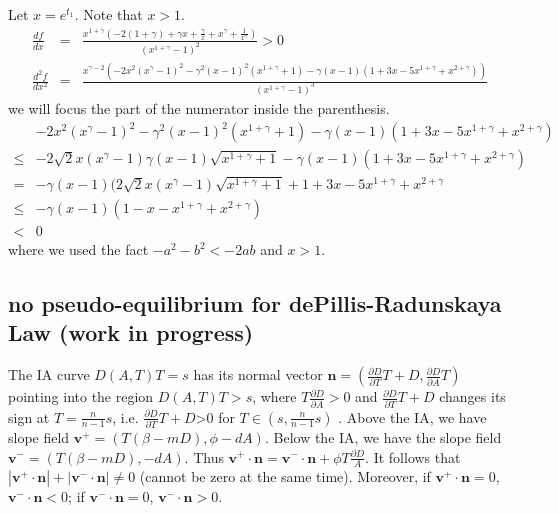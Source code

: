 \documentclass[review,authoryear]{elsarticle}
\begin{document}
Let $x=e^{t_{1}}$. Note that $x>1$. 
\begin{eqnarray*}
\frac{df}{dx} & = & \frac{x^{1+\gamma}(-2(1+\gamma)+\gamma x+\frac{\gamma}{x}+x^{\gamma}+\frac{1}{x^{\gamma}})}{(x^{1+\gamma}-1)^{2}}>0\\
\frac{d^{2}f}{dx^{2}} & = & \frac{x^{\gamma-2}(-2x^{2}(x^{\gamma}-1)^{2}-\gamma^{2}(x-1)^{2}(x^{1+\gamma}+1)-\gamma(x-1)(1+3x-5x^{1+\gamma}+x^{2+\gamma}))}{(x^{1+\gamma}-1)^{3}}
\end{eqnarray*}
we will focus the part of the numerator inside the parenthesis. 
\begin{align*}
 & -2x^{2}(x^{\gamma}-1)^{2}-\gamma^{2}(x-1)^{2}(x^{1+\gamma}+1)-\gamma(x-1)(1+3x-5x^{1+\gamma}+x^{2+\gamma})\\
\le & -2\sqrt{2}x(x^{\gamma}-1)\gamma(x-1)\sqrt{x^{1+\gamma}+1}-\gamma(x-1)(1+3x-5x^{1+\gamma}+x^{2+\gamma})\\
= & -\gamma(x-1)(2\sqrt{2}x(x^{\gamma}-1)\sqrt{x^{1+\gamma}+1}+1+3x-5x^{1+\gamma}+x^{2+\gamma}\\
\le & -\gamma(x-1)(1-x-x^{1+\gamma}+x^{2+\gamma})\\
< & 0
\end{align*}
where we used the fact $-a^{2}-b^{2}<-2ab$ and $x>1$. 

\subsection*{no pseudo-equilibrium for dePillis-Radunskaya Law (work in progress)}

The IA curve $D(A,T)T=s$ has its normal vector $\mathbf{n}=(\frac{\partial D}{\partial T}T+D,\frac{\partial D}{\partial A}T)$
pointing into the region $D(A,T)T>s$, where $T\frac{\partial D}{\partial A}>0$
and $\frac{\partial D}{\partial T}T+D$ changes its sign at $T=\frac{n}{n-1}s$,
i.e. $\frac{\partial D}{\partial T}T+D$\textgreater 0 for $T\in(s,\frac{n}{n-1}s)$
. Above the IA, we have slope field $\mathbf{v}^{+}=(T(\beta-mD),\phi-dA).$
Below the IA, we have the slope field $\mathbf{v}^{-}=(T(\beta-mD),-dA).$
Thus $\mathbf{v}^{+}\cdot\mathbf{n}=\mathbf{v}^{-}\cdot\mathbf{n}+\phi T\frac{\partial D}{A}$.
It follows that $|\mathbf{v}^{+}\cdot\mathbf{n}|+|\mathbf{v}^{-}\cdot\mathbf{n}|\ne0$
(cannot be zero at the same time). Moreover, if $\mathbf{v}^{+}\cdot\mathbf{n}=0$,
$\mathbf{v}^{-}\cdot\mathbf{n}<0$; if $\mathbf{v}^{-}\cdot\mathbf{n}=0$,
$\mathbf{v}^{-}\cdot\mathbf{n}>0$.




\end{document}
